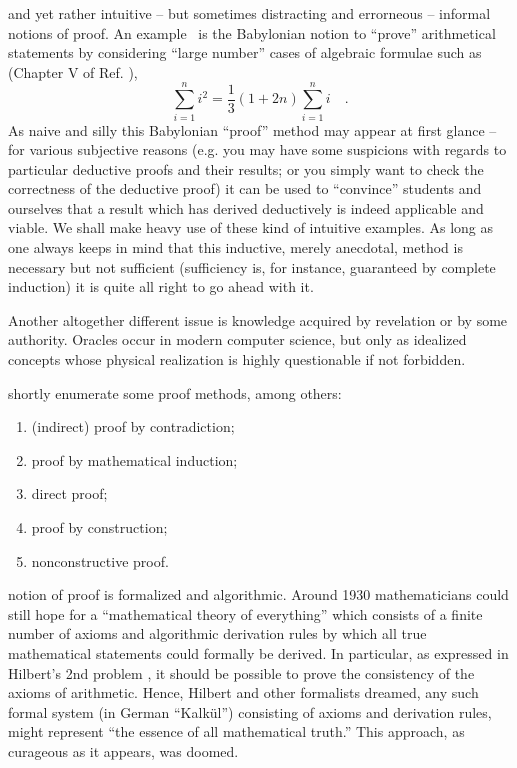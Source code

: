  and yet rather intuitive -- but sometimes distracting and errorneous -- informal notions of proof.
An example~\cite{baats1} is the Babylonian notion to ``prove'' arithmetical statements
by considering ``large number'' cases
of algebraic formulae such as  (Chapter V of Ref. \cite{neugeb}),
$$\sum_{i=1}^n i^2 = \frac{1}{3}\left(1+2n\right)\sum_{i=1}^n i \quad .$$
As naive and silly this Babylonian ``proof'' method may appear at first glance  -- for various subjective reasons
(e.g. you may have some suspicions with regards to particular deductive proofs and their results; or you simply want to check the correctness of the deductive proof)
it can be used to ``convince'' students and ourselves that
a result which has derived deductively is indeed applicable and viable.
We shall make heavy use of these kind of intuitive examples.
As long as one always keeps in mind that this inductive, merely anecdotal, method is necessary but not sufficient
(sufficiency is, for instance, guaranteed by complete induction) it is quite all right to go ahead with it.


Another altogether different issue is knowledge acquired by revelation or by some authority.
Oracles occur in modern computer science,
but only as idealized concepts whose physical realization is highly
questionable if not forbidden.

 shortly enumerate some proof methods, among others:
\begin{enumerate}
\item
(indirect) proof by contradiction;
\item
proof by mathematical induction;
\item
direct proof;
\item
proof by construction;
\item
nonconstructive proof.
\end{enumerate}


 notion of proof is formalized and algorithmic.
Around 1930 mathematicians could still hope for a
``mathematical theory of everything''
which consists of a finite number of axioms and algorithmic derivation rules
by which all true mathematical statements could formally be derived.
In particular, as expressed in Hilbert's 2nd problem \citep{hilbert-1900e},
it should be possible to prove the consistency of the axioms of arithmetic.
Hence, Hilbert and other formalists dreamed, any such formal system (in German
``Kalk\"ul'') consisting of axioms and derivation rules, might
represent ``the essence of all mathematical truth.''
This approach, as curageous as it appears, was doomed.

